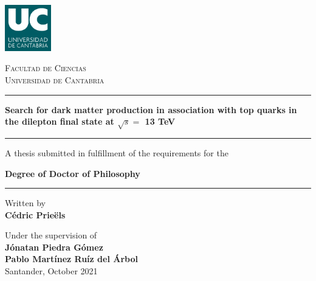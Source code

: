 \documentclass[a4paper, 10pt, openright]{report}
\begin{document}
\renewcommand{\listfigurename}{List of figures} 
\renewcommand{\listtablename}{List of tables}
\renewcommand{\floatpagefraction}{.95}%


\setlength{\parfillskip}{0pt plus\dimexpr\textwidth-2\parindent}

\doublespacing
{}\baselineskip
\setlength{\parindent}{0pt}	

\renewcommand{\arraystretch}{1.5}

\begin{titlepage}

	\centering
	\includegraphics[width=0.15\textwidth]{figs/image_UC.png}\par
	{\scshape\LARGE Facultad de Ciencias \\ \vspace{-15pt} Universidad de Cantabria \par}
	
	\vspace{0.8cm}
	
	\noindent\rule{15cm}{0.4pt}\par 
	{\huge\bfseries Search for dark matter production in association with top quarks in the dilepton final state at $\sqrt{s} = $ 13 TeV\par \vspace{10pt}}
	\noindent\rule{15cm}{0.4pt}\par 
	
	{\vspace{20pt} \Large A thesis submitted in fulfillment of the requirements for the \par \LARGE \textbf{Degree of Doctor of Philosophy} \vspace{20pt} \par \noindent\rule{15cm}{0.4pt}}
	
	\vspace{0.8cm}
	{\Large Written by \\ \textbf{C\'{e}dric Prie\"{e}ls}\par}
	\vspace{0.5cm}
	{\Large Under the supervision of \\ \textbf{J\'{o}natan Piedra G\'{o}mez} \\
	\vspace{-10pt}
	\textbf{Pablo Mart\'{i}nez Ru\'{i}z del \'{A}rbol}\\}
	\vspace{2.6cm}
	{\Large Santander, October 2021}
	\vfill

\end{titlepage}
\end{document}
